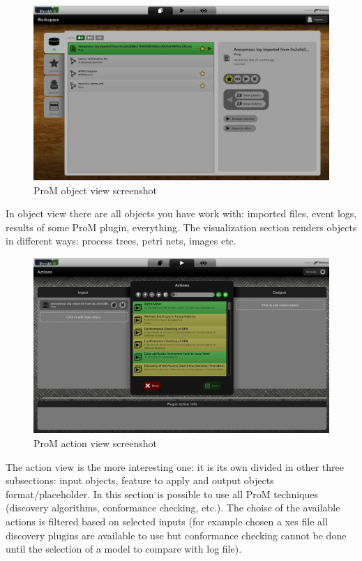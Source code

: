 \begin{figure}[!ht]
    \centering
\includegraphics[width=\textwidth]{images/prom_screen_object.png}
    \caption{ProM object view screenshot}
    \label{images:prom_screen_object}
\end{figure}

In object view there are all objects you have work with: imported files, event logs, results of some ProM plugin, everything.
The visualization section renders objects in different ways: process trees, petri nets, images etc.

\begin{figure}[!ht]
    \centering
\includegraphics[width=\textwidth]{images/prom_screen_action.png}
    \caption{ProM action view screenshot}
    \label{images:prom_screen_action}
\end{figure}

The action view is the more interesting one: it is its own divided in other three subsections: input objects, feature to apply 
and output objects format/placeholder. In this section is possible to use all ProM techniques (discovery algorithms, 
conformance checking, etc.). The choise of the available actions is filtered based on selected inputs (for example chosen 
a xes file all discovery plugins are available to use but conformance checking cannot be done until the selection of a model to 
compare with log file).

